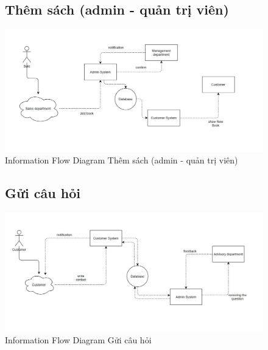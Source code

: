 \documentclass{report}
\begin{document}
\begin{center}
    \begin{figure}[htp]
        \subsection{Thêm sách (admin - quản trị viên)}
        \begin{center}
            \includegraphics[scale = 0.65]{image/ifd_addbook_admin.png}
        \end{center}
        \caption{Information Flow Diagram Thêm sách (admin - quản trị viên)}
    \end{figure}
\end{center}

\begin{center}
    \begin{figure}[htp]
        \subsection{Gửi câu hỏi}
        \begin{center}
            \includegraphics[scale = 0.55]{image/ifd_guicauhoi.png}
        \end{center}
        \caption{Information Flow Diagram Gửi câu hỏi}
    \end{figure}
\end{center}
\end{document}
